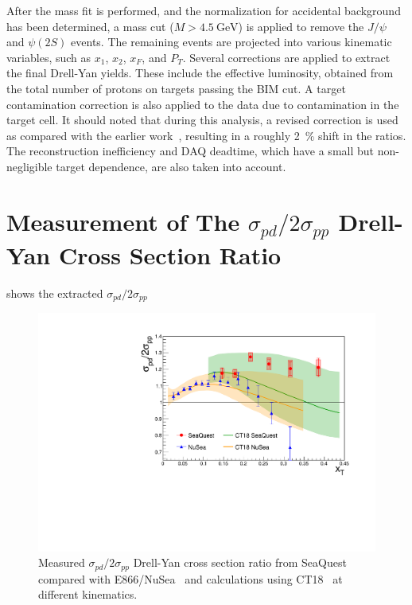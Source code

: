 \documentclass[reprint,aps,unsortedaddress,superscriptaddress,prc,floatfix,showpacs,linenumbers]{revtex4-2}
\begin{document}
After the mass fit is performed, and the normalization for accidental background has been determined,
a mass cut ($M>\SI{4.5}{\GeV}$) is applied to remove the $J/\psi$ and $\psi\left(2S\right)$ events.
The remaining events are projected into various kinematic variables, such as $x_1$, $x_2$, $x_F$, and $P_T$.
Several corrections are applied to extract the final Drell-Yan yields.
These include the effective luminosity, obtained from the total number of protons on targets passing the BIM cut.
A target contamination correction is also applied to the  data due to  contamination in the target cell.
It should noted that during this analysis,
a revised correction is used as compared with the earlier work~\cite{dove2021,dove2023},
resulting in a roughly \SI{2}{\percent} shift in the ratios.
The reconstruction inefficiency and DAQ deadtime, which have a small but non-negligible target dependence,
are also taken into account.


\section{Measurement of The \texorpdfstring{$\sigma_{pd}/2\sigma_{pp}$}{pd/2pp} Drell-Yan Cross Section Ratio}
\label{sec:csr}
 shows the extracted $\sigma_{pd}/2\sigma_{pp}$
\begin{figure}[htbp!]
	\centering
	\includegraphics[width=\linewidth]{E906_E866_xT_CT18only.pdf}
	\caption{Measured $\sigma_{pd}/2\sigma_{pp}$ Drell-Yan cross section ratio from SeaQuest compared with E866/NuSea~\cite{towell2001}
		and calculations using CT18~\cite{hou2021} at different kinematics.}
	\label{fig:xT_csr}
\end{figure}
\end{document}
